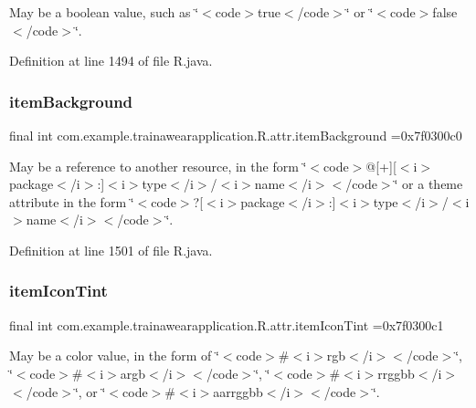 May be a boolean value, such as \char`\"{}$<$code$>$true$<$/code$>$\char`\"{} or \char`\"{}$<$code$>$false$<$/code$>$\char`\"{}. 

Definition at line 1494 of file R.\+java.

\mbox{\label{classcom_1_1example_1_1trainawearapplication_1_1_r_1_1attr_ab1cb963f996615386ef9951786344a9b}} 
\subsubsection{\texorpdfstring{itemBackground}{itemBackground}}
{\footnotesize\ttfamily final int com.\+example.\+trainawearapplication.\+R.\+attr.\+item\+Background =0x7f0300c0\hspace{0.3cm}{\ttfamily [static]}}

May be a reference to another resource, in the form \char`\"{}$<$code$>$@\mbox{[}+\mbox{]}\mbox{[}$<$i$>$package$<$/i$>$\+:\mbox{]}$<$i$>$type$<$/i$>$/$<$i$>$name$<$/i$>$$<$/code$>$\char`\"{} or a theme attribute in the form \char`\"{}$<$code$>$?\mbox{[}$<$i$>$package$<$/i$>$\+:\mbox{]}$<$i$>$type$<$/i$>$/$<$i$>$name$<$/i$>$$<$/code$>$\char`\"{}. 

Definition at line 1501 of file R.\+java.

\mbox{\label{classcom_1_1example_1_1trainawearapplication_1_1_r_1_1attr_aa887ec7a0af320b30f79dd996a18ea37}} 
\subsubsection{\texorpdfstring{itemIconTint}{itemIconTint}}
{\footnotesize\ttfamily final int com.\+example.\+trainawearapplication.\+R.\+attr.\+item\+Icon\+Tint =0x7f0300c1\hspace{0.3cm}{\ttfamily [static]}}

May be a color value, in the form of \char`\"{}$<$code$>$\#$<$i$>$rgb$<$/i$>$$<$/code$>$\char`\"{}, \char`\"{}$<$code$>$\#$<$i$>$argb$<$/i$>$$<$/code$>$\char`\"{}, \char`\"{}$<$code$>$\#$<$i$>$rrggbb$<$/i$>$$<$/code$>$\char`\"{}, or \char`\"{}$<$code$>$\#$<$i$>$aarrggbb$<$/i$>$$<$/code$>$\char`\"{}. 

